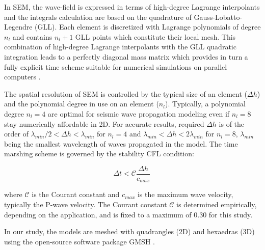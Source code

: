 \documentclass[manuscript,revised]{geophysics}
\begin{document}
\noindent In SEM, the wave-field is expressed in terms of high-degree Lagrange interpolants and the integrals calculation are based on the quadrature of Gauss-Lobatto-Legendre (GLL). Each element is discretized with Lagrange polynomials of degree $n_{l}$ and contains $n_{l}+1$ GLL points which constitute their local mesh. This combination of high-degree Lagrange interpolants with the GLL quadratic integration leads to a perfectly diagonal mass matrix which provides in turn a fully explicit time scheme suitable for numerical simulations on parallel computers \citep{komatitsch1998spectral,komatitsch1999spectral}.

\noindent The spatial resolution of SEM is controlled by the typical size of an element ($\Delta h$) and the polynomial degree in use on an element ($n_{l}$). Typically, a polynomial degree $n_{l}=4$ are optimal for seismic wave propagation modeling \citep{moczo2011finite} even if $n_{l}=8$ stay numerically affordable in 2D. For accurate results, required $\Delta h$ is of the order of $\lambda_{min} /2 < \Delta h < \lambda_{min}$ for $n_{l}=4$ and $\lambda_{min} < \Delta h < 2\lambda_{min}$ for $n_{l}=8$, $\lambda_{min}$ being the smallest wavelength of waves propagated in the model. The time marshing scheme is governed by the stability CFL condition:

\begin{equation}
	\Delta t < \mathcal{C}\frac{\Delta h}{c_{max}}\,   
\end{equation}

\noindent where $\mathcal{C}$ is the Courant constant and $c_{max}$ is the maximum wave velocity, typically the P-wave velocity. The Courant constant $\mathcal{C}$ is determined empirically, depending on the application, and is fixed to a maximum of 0.30 for this study.

\noindent In our study, the models are meshed with quadrangles (2D) and hexaedras (3D) using the open-source software package GMSH \citep{Geuzaine_MSH_2009}. 

\end{document}
